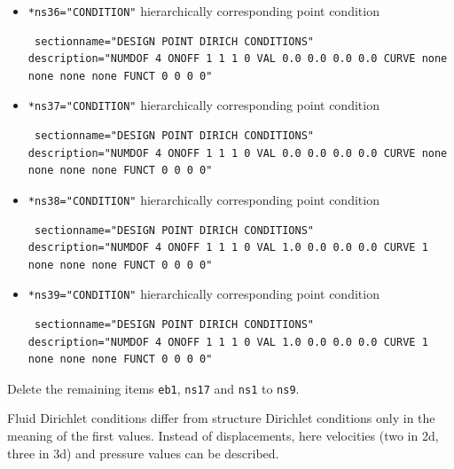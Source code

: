 \begin{itemize}
 \item \verb|*ns36="CONDITION"| \qquad hierarchically corresponding point condition
\begin{small} \begin{verbatim} sectionname="DESIGN POINT DIRICH CONDITIONS"
description="NUMDOF 4 ONOFF 1 1 1 0 VAL 0.0 0.0 0.0 0.0 CURVE none none none none FUNCT 0 0 0 0"
\end{verbatim} \end{small}

 \item \verb|*ns37="CONDITION"| \qquad hierarchically corresponding point condition
\begin{small} \begin{verbatim} sectionname="DESIGN POINT DIRICH CONDITIONS"
description="NUMDOF 4 ONOFF 1 1 1 0 VAL 0.0 0.0 0.0 0.0 CURVE none none none none FUNCT 0 0 0 0"
\end{verbatim} \end{small}

 \item \verb|*ns38="CONDITION"| \qquad hierarchically corresponding point condition
\begin{small} \begin{verbatim} sectionname="DESIGN POINT DIRICH CONDITIONS"
description="NUMDOF 4 ONOFF 1 1 1 0 VAL 1.0 0.0 0.0 0.0 CURVE 1 none none none FUNCT 0 0 0 0"
\end{verbatim} \end{small}

\item \verb|*ns39="CONDITION"| \qquad hierarchically corresponding point condition
\begin{small} \begin{verbatim} sectionname="DESIGN POINT DIRICH CONDITIONS"
description="NUMDOF 4 ONOFF 1 1 1 0 VAL 1.0 0.0 0.0 0.0 CURVE 1 none none none FUNCT 0 0 0 0"
\end{verbatim} \end{small}

\end{itemize}

Delete the remaining items \verb|eb1|, \verb|ns17| and \verb|ns1| to \verb|ns9|. \newline

Fluid Dirichlet conditions differ from structure Dirichlet conditions only in the meaning of the first values. Instead of displacements, here velocities (two in 2d, three in 3d) and pressure values can be described.

